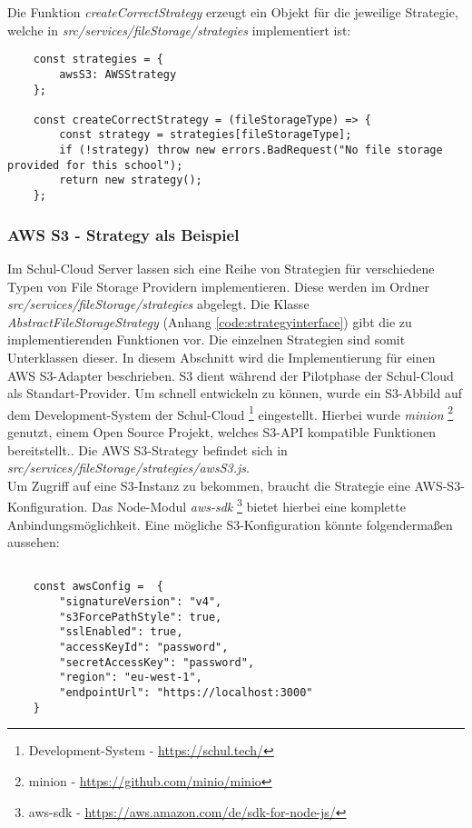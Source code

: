 Die Funktion \textit{createCorrectStrategy} erzeugt ein Objekt für die jeweilige Strategie, welche in \textit{src/services/fileStorage/strategies} implementiert ist:

\begin{lstlisting}
	const strategies = {
		awsS3: AWSStrategy
	};

	const createCorrectStrategy = (fileStorageType) => {
		const strategy = strategies[fileStorageType];
		if (!strategy) throw new errors.BadRequest("No file storage provided for this school");
		return new strategy();
	};
\end{lstlisting}

\subsubsection{AWS S3 - Strategy als Beispiel}
\label{sec:awss3impl}

Im Schul-Cloud Server lassen sich eine Reihe von Strategien für verschiedene Typen von File Storage Providern implementieren. Diese werden im Ordner \textit{src/services/fileStorage/strategies} abgelegt. Die Klasse \textit{AbstractFileStorageStrategy} (Anhang \ref{code:strategyinterface}) gibt die zu implementierenden Funktionen vor. Die einzelnen Strategien sind somit Unterklassen dieser. In diesem Abschnitt wird die Implementierung für einen AWS S3-Adapter beschrieben. S3 dient während der Pilotphase der Schul-Cloud als Standart-Provider. Um schnell entwickeln zu können, wurde ein S3-Abbild auf dem Development-System der Schul-Cloud \footnote{Development-System - \url{https://schul.tech/}} eingestellt. Hierbei wurde \textit{minion} \footnote{minion - \url{https://github.com/minio/minio}} genutzt, einem Open Source Projekt, welches S3-API kompatible Funktionen bereitstellt.. Die AWS S3-Strategy befindet sich in \textit{src/services/fileStorage/strategies/awsS3.js}. \\

Um Zugriff auf eine S3-Instanz zu bekommen, braucht die Strategie eine AWS-S3-Konfiguration. Das Node-Modul \textit{aws-sdk} \footnote{aws-sdk - \url{https://aws.amazon.com/de/sdk-for-node-js/}} bietet hierbei eine komplette Anbindungsmöglichkeit. Eine mögliche S3-Konfiguration könnte folgendermaßen aussehen:

\begin{lstlisting}
	
	const awsConfig =  {
		"signatureVersion": "v4",
		"s3ForcePathStyle": true,
		"sslEnabled": true,
		"accessKeyId": "password",
		"secretAccessKey": "password",
		"region": "eu-west-1",
		"endpointUrl": "https://localhost:3000"
	}
\end{lstlisting}

